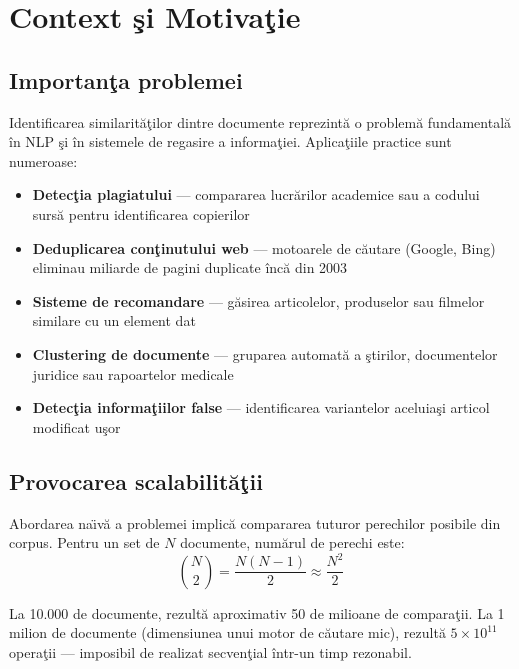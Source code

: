 \documentclass[a4paper,12pt]{report}
\begin{document}
\chapter{Context \c{s}i Motiva\c{t}ie}

\section{Importan\c{t}a problemei}

Identificarea similarit\u{a}\c{t}ilor dintre documente reprezint\u{a} o problem\u{a} fundamental\u{a} \^{i}n \ac{NLP} \c{s}i \^{i}n sistemele de regasire a informa\c{t}iei. Aplica\c{t}iile practice sunt numeroase:

\begin{itemize}
  \item \textbf{Detec\c{t}ia plagiatului} — compararea lucr\u{a}rilor academice sau a codului surs\u{a} pentru identificarea copierilor
  \item \textbf{Deduplicarea con\c{t}inutului web} — motoarele de c\u{a}utare (Google, Bing) eliminau miliarde de pagini duplicate \^{i}nc\u{a} din 2003
  \item \textbf{Sisteme de recomandare} — g\u{a}sirea articolelor, produselor sau filmelor similare cu un element dat
  \item \textbf{Clustering de documente} — gruparea automat\u{a} a \c{s}tirilor, documentelor juridice sau rapoartelor medicale
  \item \textbf{Detec\c{t}ia informa\c{t}iilor false} — identificarea variantelor aceluia\c{s}i articol modificat u\c{s}or
\end{itemize}

\section{Provocarea scalabilit\u{a}\c{t}ii}

Abordarea na\"{\i}v\u{a} a problemei implic\u{a} compararea tuturor perechilor posibile din corpus. Pentru un set de $N$ documente, num\u{a}rul de perechi este:
\begin{equation}
  \binom{N}{2} = \frac{N(N-1)}{2} \approx \frac{N^2}{2}
\label{eq:naive}
\end{equation}

La 10.000 de documente, rezult\u{a} aproximativ 50 de milioane de compara\c{t}ii. La 1 milion de documente (dimensiunea unui motor de c\u{a}utare mic), rezult\u{a} $5 \times 10^{11}$ opera\c{t}ii — imposibil de realizat secven\c{t}ial \^{i}ntr-un timp rezonabil.
\end{document}
